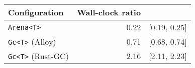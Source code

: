 \begin{tabular}{lrr}
\toprule
    Configuration & Wall-clock ratio & \\
\midrule
\texttt{Arena<T>}          & 0.22 & \scriptsize\textcolor{gray!60}{[0.19, 0.25]} \\
\texttt{Gc<T>} (Alloy)     & 0.71 & \scriptsize\textcolor{gray!60}{[0.68, 0.74]} \\
\texttt{Gc<T>} (Rust-GC)   & 2.16 & \scriptsize\textcolor{gray!60}{[2.11, 2.23]} \\
\bottomrule
\end{tabular}
